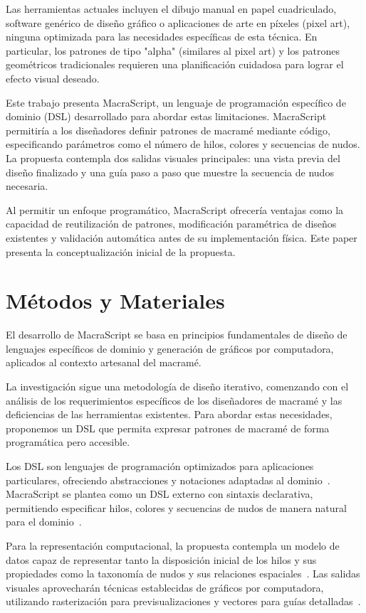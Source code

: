 \documentclass[conference]{IEEEtran}
\begin{document}
Las herramientas actuales incluyen el dibujo manual en papel cuadriculado, software genérico de diseño gráfico o aplicaciones de arte en píxeles (pixel art), ninguna optimizada para las necesidades específicas de esta técnica. En particular, los patrones de tipo "alpha" (similares al pixel art) y los patrones geométricos tradicionales requieren una planificación cuidadosa para lograr el efecto visual deseado.

Este trabajo presenta MacraScript, un lenguaje de programación específico de dominio (DSL) desarrollado para abordar estas limitaciones. MacraScript permitiría a los diseñadores definir patrones de macramé mediante código, especificando parámetros como el número de hilos, colores y secuencias de nudos. La propuesta contempla dos salidas visuales principales: una vista previa del diseño finalizado y una guía paso a paso que muestre la secuencia de nudos necesaria.

Al permitir un enfoque programático, MacraScript ofrecería ventajas como la capacidad de reutilización de patrones, modificación paramétrica de diseños existentes y validación automática antes de su implementación física. Este paper presenta la conceptualización inicial de la propuesta.

\section{Métodos y Materiales}
El desarrollo de MacraScript se basa en principios fundamentales de diseño de lenguajes específicos de dominio y generación de gráficos por computadora, aplicados al contexto artesanal del macramé.

La investigación sigue una metodología de diseño iterativo, comenzando con el análisis de los requerimientos específicos de los diseñadores de macramé y las deficiencias de las herramientas existentes. Para abordar estas necesidades, proponemos un DSL que permita expresar patrones de macramé de forma programática pero accesible.

Los DSL son lenguajes de programación optimizados para aplicaciones particulares, ofreciendo abstracciones y notaciones adaptadas al dominio~\cite{fowler2010}. MacraScript se plantea como un DSL externo con sintaxis declarativa, permitiendo especificar hilos, colores y secuencias de nudos de manera natural para el dominio~\cite{voelter2013}.

Para la representación computacional, la propuesta contempla un modelo de datos capaz de representar tanto la disposición inicial de los hilos y sus propiedades como la taxonomía de nudos y sus relaciones espaciales~\cite{hashemi2017}. Las salidas visuales aprovecharán técnicas establecidas de gráficos por computadora, utilizando rasterización para previsualizaciones y vectores para guías detalladas~\cite{hudson2018}.
\end{document}
